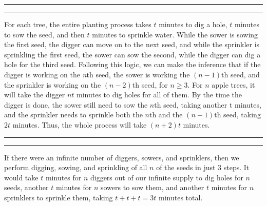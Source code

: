 \documentclass[11pt]{article}
\newcounter{questionCounter}
\newcounter{partCounter}[questionCounter]
\newenvironment{question}[2][\arabic{questionCounter}]{%
    \setcounter{partCounter}{0}%
    \vspace{.25in} \hrule \vspace{0.5em}%
        \noindent{\bf #2}%
    \vspace{0.8em} \hrule \vspace{.10in}%
    \addtocounter{questionCounter}{1}%
}{}
\begin{document}
\begin{question}{Task 7.5}
For each tree, the entire planting process takes $t$ minutes to dig a hole, $t$ minutes to sow the seed, and then $t$ minutes to sprinkle water. While the sower is sowing the first seed, the digger can move on to the next seed, and while the sprinkler is sprinkling the first seed, the sower can sow the second, while the digger can dig a hole for the third seed. Following this logic, we can make the inference that if the digger is working on the \emph{n}th seed, the sower is working the $(n-1)$th seed, and the sprinkler is working on the $(n-2)$th seed, for $n \geq 3$. For $n$ apple trees, it will take the digger $nt$ minutes to dig holes for all of them. By the time the digger is done, the sower still need to sow the $n$th seed, taking another t minutes, and the sprinkler needs to sprinkle both the $n$th and the $(n-1)$th seed, taking $2t$ minutes. Thus, the whole process will take $(n+2)t$ minutes.
\end{question}

\begin{question}{Task 7.6}
If there were an infinite number of diggers, sowers, and sprinklers, then we perform digging, sowing, and sprinkling of all $n$ of the seeds in just 3 steps. It would take $t$ minutes for $n$ diggers out of our infinite supply to dig holes for $n$ seeds, another $t$ minutes for $n$ sowers to sow them, and another $t$ minutes for $n$ sprinklers to sprinkle them, taking $t+t+t=3t$ minutes total.
\end{question}
\end{document}
